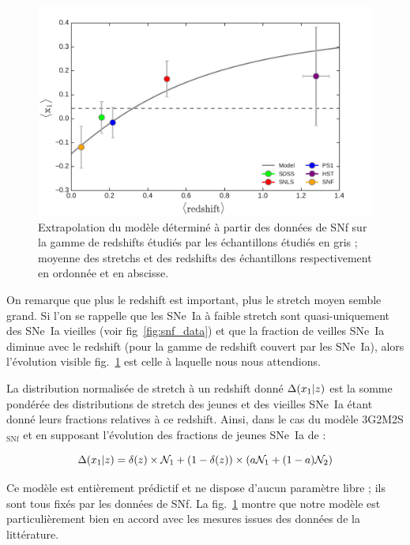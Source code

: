 \documentclass[a4paper, 12pt, svgnames]{article}
\begin{document}
\begin{figure}[htbp!]
    \centering
    \includegraphics[width=.7\linewidth]{Rapport_figures/model_snf.pdf}
    \captionsetup{justification=centering}
    \caption{Extrapolation du modèle déterminé à partir des données de SNf sur
    la gamme de redshifts étudiés par les échantillons étudiés en gris ; moyenne
des stretchs et des redshifts des échantillons respectivement en ordonnée et en
abscisse.}
    \label{fig:model_snf}
\end{figure}

On remarque que plus le redshift est important, plus le stretch moyen semble
grand. Si l'on se rappelle que les SNe~Ia à faible stretch sont quasi-uniquement
des SNe~Ia vieilles (voir fig~\ref{fig:snf_data}) et que la fraction de veilles
SNe~Ia diminue avec le redshift (pour la gamme de redshift couvert par les
SNe~Ia), alors l'évolution visible fig.~\ref{fig:model_snf} est celle à laquelle
nous nous attendions. \bigbreak

La distribution normalisée de stretch à un redshift donné $\Delta(x_1 | z)$ est la
somme pondérée des distributions de stretch des jeunes et des vieilles SNe~Ia
étant donné leurs fractions relatives à ce redshift. Ainsi, dans le cas du
modèle 3G2M2S$_{\mathrm{SNf}}$ et en supposant l'évolution des fractions de
jeunes SNe~Ia de \cite{rigault_strong_2018} :

\begin{equation}
    \label{eq:dist}
    \Delta(x_1 | z) = \delta(z) \times\mathcal{N}_1 + \left(1-\delta(z)\right)\times
    \left(a\mathcal{N}_1 + (1-a) \mathcal{N}_2\right)
\end{equation}

Ce modèle est entièrement prédictif et ne dispose d'aucun paramètre libre ; ils
sont tous fixés par les données de SNf. La fig.~\ref{fig:model_snf} montre que
notre modèle est particulièrement bien en accord avec les mesures issues des
données de la littérature. \bigbreak
\end{document}
